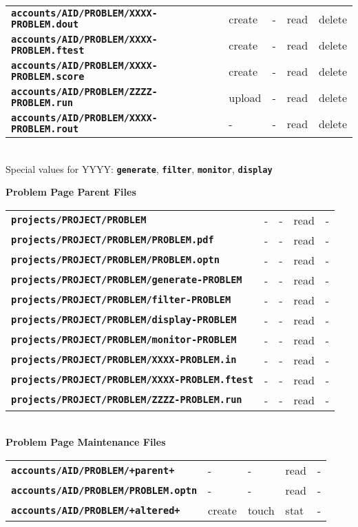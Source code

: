 \documentclass[12pt]{article}
\newcommand{\TT}[1]{{\tt \bfseries #1}}
\begin{document}
\begin{center}
\begin{tabular}{lllll}
\TT{accounts/AID/PROBLEM/XXXX-PROBLEM.dout} & create  & -  & read & delete \\
\TT{accounts/AID/PROBLEM/XXXX-PROBLEM.ftest} & create  & - & read & delete \\
\TT{accounts/AID/PROBLEM/XXXX-PROBLEM.score} & create  & - & read & delete
\\[1ex]
\TT{accounts/AID/PROBLEM/ZZZZ-PROBLEM.run}  & upload  & - & read & delete \\
\TT{accounts/AID/PROBLEM/XXXX-PROBLEM.rout} & -  & -  & read & delete \\
\end{tabular}
\\[1ex]
Special values for YYYY: \TT{generate}, \TT{filter}, \TT{monitor}, \TT{display}

\newpage

{\bf Problem Page Parent Files}
\\[1ex]
\begin{tabular}{lllll}
\TT{projects/PROJECT/PROBLEM}	        	& -  & - & read & - \\
\TT{projects/PROJECT/PROBLEM/PROBLEM.pdf}    	& -  & - & read & - \\
\TT{projects/PROJECT/PROBLEM/PROBLEM.optn}    	& -  & - & read & - \\
\TT{projects/PROJECT/PROBLEM/generate-PROBLEM} 	& -  & - & read & - \\
\TT{projects/PROJECT/PROBLEM/filter-PROBLEM} 	& -  & - & read & - \\
\TT{projects/PROJECT/PROBLEM/display-PROBLEM} 	& -  & - & read & - \\
\TT{projects/PROJECT/PROBLEM/monitor-PROBLEM} 	& -  & - & read & - \\
\TT{projects/PROJECT/PROBLEM/XXXX-PROBLEM.in}	& -  & - & read & - \\
\TT{projects/PROJECT/PROBLEM/XXXX-PROBLEM.ftest} & -  & - & read & - \\
\TT{projects/PROJECT/PROBLEM/ZZZZ-PROBLEM.run} & -  & - & read & -
\\[1ex]
\end{tabular}
\\\bigskip
{\bf Problem Page Maintenance Files}
\\[1ex]
\begin{tabular}{lllll}
\TT{accounts/AID/PROBLEM/+parent+}	& -  & - & read & - \\
\TT{accounts/AID/PROBLEM/PROBLEM.optn}	& -  & - & read & - \\
\TT{accounts/AID/PROBLEM/+altered+}	& create  & touch & stat & - \\

\end{tabular}
\end{center}
\end{document}
